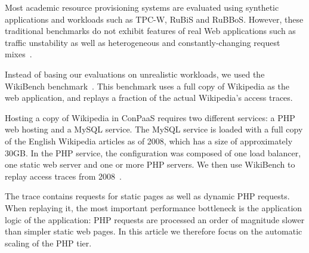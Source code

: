 

Most academic resource provisioning systems are evaluated using
synthetic applications and workloads such as TPC-W, RuBiS and
RuBBoS. However, these traditional benchmarks do not exhibit features
of real Web applications such as traffic unstability as well as
heterogeneous and constantly-changing request mixes~\cite{benchlab}.

Instead of basing our evaluations on unrealistic workloads, we used
the WikiBench benchmark~\cite{wikibench}. This benchmark uses a full
copy of Wikipedia as the web application, and replays a fraction of
the actual Wikipedia's access traces. 


Hosting a copy of Wikipedia in ConPaaS requires two different
services: a PHP web hosting and a MySQL service. The MySQL service is
loaded with a full copy of the English Wikipedia articles as of 2008,
which has a size of approximately 30GB.  In the PHP service, the
configuration was composed of one load balancer, one static web server
and one or more PHP servers. We then use WikiBench to replay access
traces from 2008~\cite{urdaneta2009}.





The trace contains requests for static pages as well as dynamic PHP
requests. When replaying it, the most important performance bottleneck
is the application logic of the application: PHP requests are
processed an order of magnitude slower than simpler static web
pages. In this article we therefore focus on the automatic scaling of
the PHP tier.

